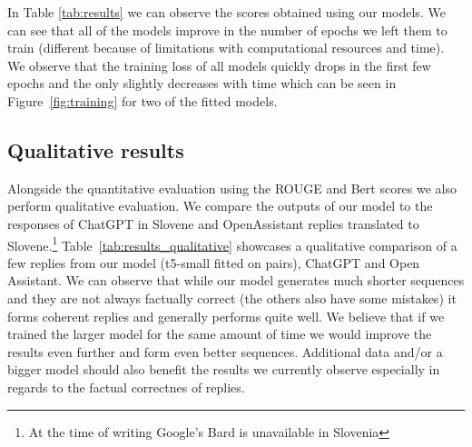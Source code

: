 \documentclass[fleqn,moreauthors,10pt]{ds_report}
\begin{document}
    In Table \ref{tab:results} we can observe the scores obtained using our models.
    We can see that all of the models improve in the number of epochs we left them to train (different because of limitations with computational resources and time).
    We observe that the training loss of all models quickly drops in the first few epochs and the only slightly decreases with time which can be seen in Figure~\ref{fig:training} for two of the fitted models.
    
    \subsection*{Qualitative results}
    Alongside the quantitative evaluation using the ROUGE and Bert scores we also perform qualitative evaluation. We compare the outputs of our model to the responses of ChatGPT in Slovene and OpenAssistant replies translated to Slovene.\footnote{At the time of writing Google's Bard is unavailable in Slovenia}
    Table~\ref{tab:results_qualitative} showcases a qualitative comparison of a few replies from our model (t5-small fitted on pairs), ChatGPT and Open Assistant.
    We can observe that while our model generates much shorter sequences and they are not always factually correct (the others also have some mistakes) it forms coherent replies and generally performs quite well.
    We believe that if we trained the larger model for the same amount of time we would improve the results even further and form even better sequences.
    Additional data and/or a bigger model should also benefit the results we currently observe especially in regards to the factual correctnes of replies.
    
\end{document}
